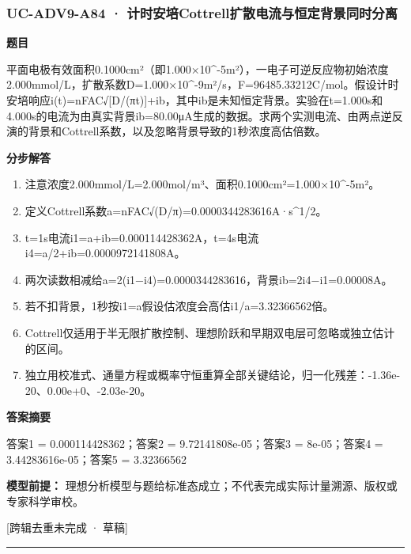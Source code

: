 \documentclass[UTF8,11pt,a4paper]{ctexart}
\begin{document}
\subsubsection*{UC-ADV9-A84 · 计时安培Cottrell扩散电流与恒定背景同时分离}
\noindent\textbf{题目}\par
平面电极有效面积0.1000cm²（即1.000×10\textasciicircum{}-5m²），一电子可逆反应物初始浓度2.000mmol/L，扩散系数D=1.000×10\textasciicircum{}-9m²/s，F=96485.33212C/mol。假设计时安培响应i(t)=nFAC√[D/(πt)]+ib，其中ib是未知恒定背景。实验在t=1.000s和4.000s的电流为由真实背景ib=80.00μA生成的数据。求两个实测电流、由两点逆反演的背景和Cottrell系数，以及忽略背景导致的1秒浓度高估倍数。\par
\medskip\noindent\textbf{分步解答}
\begin{enumerate}
\item 注意浓度2.000mmol/L=2.000mol/m³、面积0.1000cm²=1.000×10\textasciicircum{}-5m²。
\item 定义Cottrell系数a=nFAC√(D/π)=0.0000344283616A·s\textasciicircum{}1/2。
\item t=1s电流i1=a+ib=0.000114428362A，t=4s电流i4=a/2+ib=0.0000972141808A。
\item 两次读数相减给a=2(i1−i4)=0.0000344283616，背景ib=2i4−i1=0.00008A。
\item 若不扣背景，1秒按i1=a假设估浓度会高估i1/a=3.32366562倍。
\item Cottrell仅适用于半无限扩散控制、理想阶跃和早期双电层可忽略或独立估计的区间。
\item 独立用校准式、通量方程或概率守恒重算全部关键结论，归一化残差：-1.36e-20、0.00e+0、-2.03e-20。
\end{enumerate}
\noindent\textbf{答案摘要}\par
答案1 = 0.000114428362；答案2 = 9.72141808e-05；答案3 = 8e-05；答案4 = 3.44283616e-05；答案5 = 3.32366562\par
\noindent\textbf{模型前提：}
理想分析模型与题给标准态成立；不代表完成实际计量溯源、版权或专家科学审校。\par
\noindent\textcolor{red!65!black}{[跨辑去重未完成 · 草稿]} \par
\medskip\hrule\medskip
{}
\end{document}
